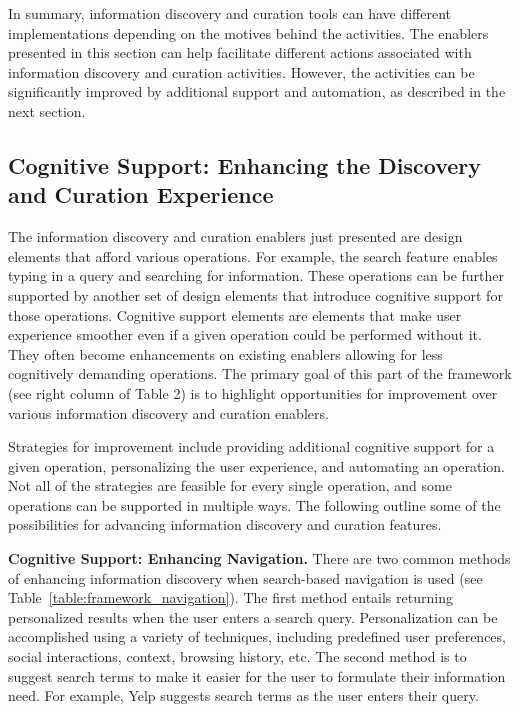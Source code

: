 \documentclass[review]{elsarticle}
\newcommand{\feature}[1]{{\ttfamily#1}}
\begin{document}
{%
In summary, information discovery and curation tools can have different implementations depending on the motives behind the activities. The enablers presented in this section can help facilitate different actions associated with information discovery and curation activities. However, the activities can be significantly improved by additional support and automation, as described in the next section.


{\subsection{Cognitive Support: Enhancing the Discovery and Curation Experience}

The information discovery and curation enablers just presented are design elements that afford various operations. For example, the search feature enables typing in a query and searching for information. These operations can be further supported by another set of design elements that introduce cognitive support for those operations. Cognitive support elements are elements that make user experience smoother even if a given operation could be performed without it. They often become enhancements on existing enablers allowing for less cognitively demanding operations. The primary goal of this part of the framework (see right column of Table 2) is to highlight opportunities for improvement over various information discovery and curation enablers.
%

Strategies for improvement include providing additional cognitive support for a given operation, personalizing the user experience, and automating an operation. Not all of the strategies are feasible for every single operation, and some operations can be supported in multiple ways. The following  outline some of the possibilities for advancing information discovery and curation features. 

{\textbf{Cognitive Support: Enhancing Navigation.}
There are two common methods of enhancing information discovery when search-based navigation is used (see Table~\ref{table:framework_navigation}). The first method entails returning personalized results when the user enters a search query. \feature{Personalization} can be accomplished using a variety of techniques, including predefined user preferences, social interactions, context, browsing history, etc. The second method is to \feature{suggest search terms} to make it easier for the user to formulate their information need. For example, Yelp suggests search terms as the user enters their query.

}}}
\end{document}
